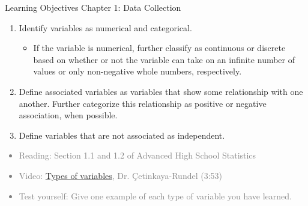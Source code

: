 \documentclass[11pt]{article}
\newcommand{\gray}[1]{\textcolor{gray}{#1}}
\begin{document}
{\LARGE \textcolor{oiB}{Learning Objectives \hfill Chapter 1: Data Collection}} \\

\begin{enumerate}
\renewcommand\labelenumi{\textcolor{light}{\textbf{LO \theenumi.}}}
\item Identify variables as numerical and categorical.
\begin{itemize}
\renewcommand{\labelitemi}{{\textcolor{dark}{{\tiny $\blacksquare$}}}}
\item If the variable is numerical, further classify as continuous or discrete based on whether or not the variable can take on an infinite number of values or only non-negative whole numbers, respectively.
\end{itemize}

\item Define associated variables as variables that show some relationship with one another. Further categorize this relationship as positive or negative association, when possible.

\item Define variables that are not associated as independent.

\end{enumerate}
\gray{
{\it
\vspace{-0.75cm}
\begin{itemize}
\renewcommand{\labelitemi}{{\textcolor{dark}{$\ast$}}}
\item Reading: Section 1.1 and 1.2 of Advanced High School Statistics
\item Video: \href{http://youtu.be/haug_BjhgE0}{Types of variables}, Dr. \c{C}etinkaya-Rundel (3:53)
\item Test yourself: Give one example of each type of variable you have learned. \\
\end{itemize}
}}

%

\vspace{0.5cm}

%
\end{document}
